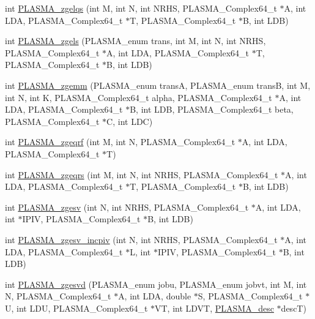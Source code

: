 \begin{DoxyCompactItemize}
\item 
int \hyperlink{group__PLASMA__Complex64__t_ga93299f75fbba6fadbe859e60ff395733_ga93299f75fbba6fadbe859e60ff395733}{PLASMA\_\-zgelqs} (int M, int N, int NRHS, PLASMA\_\-Complex64\_\-t $\ast$A, int LDA, PLASMA\_\-Complex64\_\-t $\ast$T, PLASMA\_\-Complex64\_\-t $\ast$B, int LDB)
\item 
int \hyperlink{group__PLASMA__Complex64__t_gada51cc2dfd38da1ff5f6a636c16ff972_gada51cc2dfd38da1ff5f6a636c16ff972}{PLASMA\_\-zgels} (PLASMA\_\-enum trans, int M, int N, int NRHS, PLASMA\_\-Complex64\_\-t $\ast$A, int LDA, PLASMA\_\-Complex64\_\-t $\ast$T, PLASMA\_\-Complex64\_\-t $\ast$B, int LDB)
\item 
int \hyperlink{group__PLASMA__Complex64__t_ga1a0f8d759e535f9947ae11baa0af6fa3_ga1a0f8d759e535f9947ae11baa0af6fa3}{PLASMA\_\-zgemm} (PLASMA\_\-enum transA, PLASMA\_\-enum transB, int M, int N, int K, PLASMA\_\-Complex64\_\-t alpha, PLASMA\_\-Complex64\_\-t $\ast$A, int LDA, PLASMA\_\-Complex64\_\-t $\ast$B, int LDB, PLASMA\_\-Complex64\_\-t beta, PLASMA\_\-Complex64\_\-t $\ast$C, int LDC)
\item 
int \hyperlink{group__PLASMA__Complex64__t_ga36fc6c695a8288f7ff64669c50fc4d74_ga36fc6c695a8288f7ff64669c50fc4d74}{PLASMA\_\-zgeqrf} (int M, int N, PLASMA\_\-Complex64\_\-t $\ast$A, int LDA, PLASMA\_\-Complex64\_\-t $\ast$T)
\item 
int \hyperlink{group__PLASMA__Complex64__t_gaed0fd329c8dca2063c4afc2caa781218_gaed0fd329c8dca2063c4afc2caa781218}{PLASMA\_\-zgeqrs} (int M, int N, int NRHS, PLASMA\_\-Complex64\_\-t $\ast$A, int LDA, PLASMA\_\-Complex64\_\-t $\ast$T, PLASMA\_\-Complex64\_\-t $\ast$B, int LDB)
\item 
int \hyperlink{group__PLASMA__Complex64__t_ga94397d6fba523c946f1e56cfe9aa967d_ga94397d6fba523c946f1e56cfe9aa967d}{PLASMA\_\-zgesv} (int N, int NRHS, PLASMA\_\-Complex64\_\-t $\ast$A, int LDA, int $\ast$IPIV, PLASMA\_\-Complex64\_\-t $\ast$B, int LDB)
\item 
int \hyperlink{group__PLASMA__Complex64__t_ga20ea1251fef4f13efdd798a1cf5f1bbb_ga20ea1251fef4f13efdd798a1cf5f1bbb}{PLASMA\_\-zgesv\_\-incpiv} (int N, int NRHS, PLASMA\_\-Complex64\_\-t $\ast$A, int LDA, PLASMA\_\-Complex64\_\-t $\ast$L, int $\ast$IPIV, PLASMA\_\-Complex64\_\-t $\ast$B, int LDB)
\item 
int \hyperlink{group__PLASMA__Complex64__t_ga36fc556f67632e00105090a60657dab2_ga36fc556f67632e00105090a60657dab2}{PLASMA\_\-zgesvd} (PLASMA\_\-enum jobu, PLASMA\_\-enum jobvt, int M, int N, PLASMA\_\-Complex64\_\-t $\ast$A, int LDA, double $\ast$S, PLASMA\_\-Complex64\_\-t $\ast$U, int LDU, PLASMA\_\-Complex64\_\-t $\ast$VT, int LDVT, \hyperlink{typeplasma__desc__t}{PLASMA\_\-desc} $\ast$descT)

\end{DoxyCompactItemize}
